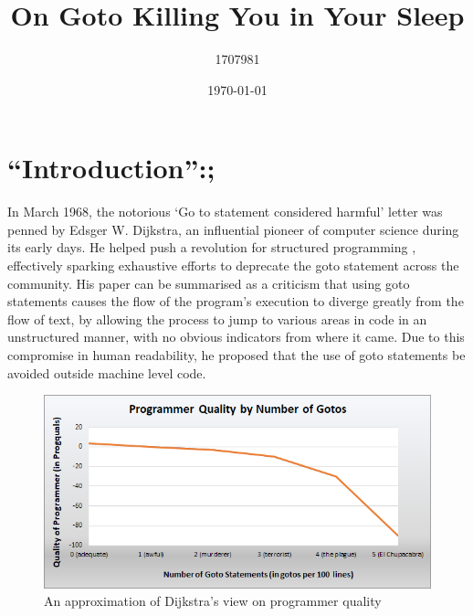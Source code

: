 \documentclass{journal}
\title{On Goto Killing You in Your Sleep}
\author{1707981}
\date{\today}
\begin{document}
\maketitle




\section{``Introduction'':;}
In March 1968, the notorious `Go to statement considered harmful' \cite{goto} letter was penned by Edsger W. Dijkstra, an influential pioneer of computer science during its early days. He helped push a revolution for structured programming \cite{structured}, effectively sparking exhaustive efforts to deprecate the goto statement \cite{revolution1, againstgoto} across the community. His paper can be summarised as a criticism that using goto statements causes the flow of the program's execution to diverge greatly from the flow of text, by allowing the process to jump to various areas in code in an unstructured manner, with no obvious indicators from where it came. Due to this compromise in human readability, he proposed that the use of goto statements be avoided outside machine level code.

\begin{figure}[h]
	\centering
	\includegraphics[width=0.95\linewidth]{Graph.png}
	\caption{An approximation of Dijkstra's view on programmer quality}
\end{figure}
\end{document}
